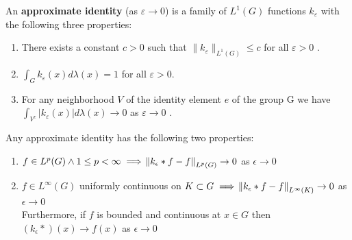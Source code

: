 \begin{definition}
An \textbf{approximate identity} (as $\varepsilon \rightarrow 0$) is a family of $L^1(G)$ functions $k_\varepsilon$ with the following three properties: 
\begin{enumerate}[label=(\roman*)]
\item There exists a constant $c > 0$ such that $\| k_\varepsilon \| _ {L^1(G)} \leqslant c$ for all $ \varepsilon > 0 $ . 
\item $ \int_G k_\varepsilon(x) d\lambda(x) = 1$ for all $\varepsilon > 0 $.
\item For any neighborhood $V$ of the identity element $e$ of the group G we have $ \int_{V^c} | k_\varepsilon(x) | d \lambda(x) \rightarrow 0  $ as $ \varepsilon \rightarrow 0 $ . 
\end{enumerate}
\end{definition}

\begin{theorem}
Any approximate identity has the following two properties:
\begin{enumerate}
\item $f \in L^p(G) \wedge 1 \leq p < \infty \implies \norm{k_\epsilon \ast f - f}_{L^p(G)} \to 0 $ as $ \epsilon \to 0$
\item $f \in L^\infty(G)$ uniformly continuous on $K \subset G \implies \norm{k_\epsilon \ast f - f}_{L^\infty(K)} \to 0$ as $\epsilon \to 0$ \\
Furthermore, if $f$ is bounded and continuous at $x \in G$ then
$ (k_\epsilon \ast )(x) \to f(x) $ as $\epsilon \to 0$ 
\end{enumerate}
\end{theorem}

